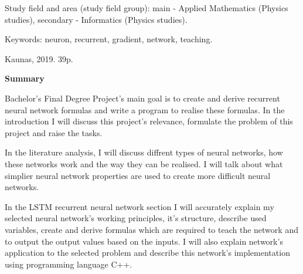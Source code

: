 Study field and area (study field group): main - Applied Mathematics (Physics studies), secondary - Informatics (Physics studies).

Keywords: neuron, recurrent, gradient, network, teaching.

Kaunas, 2019. 39p.

\begin{center}
\textbf{Summary}
\end{center}

Bachelor's Final Degree Project's main goal is to create and derive recurrent neural network formulas and write a program to realise these formulas. In the introduction I will discuss this project's relevance, formulate the problem of this project and raise the tasks.

In the literature analysis, I will discuss diffrent types of neural networks, how these networks work and the way they can be realised. I will talk about what simplier neural network properties are used to create more difficult neural networks.

In the LSTM recurrent neural network section I will accurately explain my selected neural network's working principles, it's structure, describe used variables, create and derive formulas which are required to teach the network and to output the output values based on the inputs. I will also explain network's application to the selected problem and describe this network's implementation using programming language C++.

